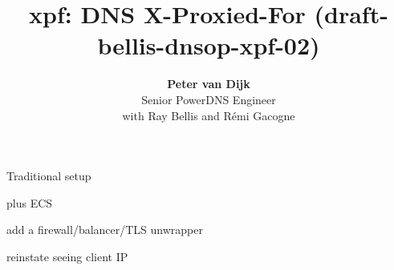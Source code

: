\documentclass{beamer}
\title[aname]{xpf: DNS X-Proxied-For (draft-bellis-dnsop-xpf-02)}
\author{\textbf{Peter van Dijk}\\Senior PowerDNS Engineer\\with Ray Bellis and Rémi Gacogne}
\date{}
\begin{document}
\begin{frame}
  \titlepage
\end{frame}

\begin{frame}{Traditional setup}
\end{frame}

\begin{frame}{plus ECS}
\end{frame}

\begin{frame}{add a firewall/balancer/TLS unwrapper}
\end{frame}

\begin{frame}{reinstate seeing client IP}
\end{frame}
\end{document}
